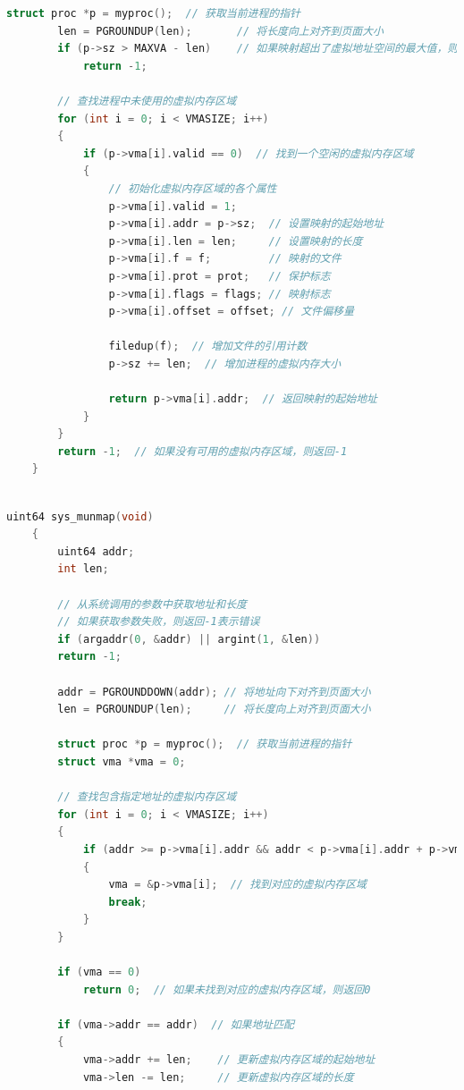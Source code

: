 \begin{enumerate}
\begin{lstlisting}[language=c,title=sys\_mmap的实现]
        struct proc *p = myproc();  // 获取当前进程的指针
        len = PGROUNDUP(len);       // 将长度向上对齐到页面大小
        if (p->sz > MAXVA - len)    // 如果映射超出了虚拟地址空间的最大值，则返回-1
            return -1;
    
        // 查找进程中未使用的虚拟内存区域
        for (int i = 0; i < VMASIZE; i++)
        {
            if (p->vma[i].valid == 0)  // 找到一个空闲的虚拟内存区域
            {
                // 初始化虚拟内存区域的各个属性
                p->vma[i].valid = 1;
                p->vma[i].addr = p->sz;  // 设置映射的起始地址
                p->vma[i].len = len;     // 设置映射的长度
                p->vma[i].f = f;         // 映射的文件
                p->vma[i].prot = prot;   // 保护标志
                p->vma[i].flags = flags; // 映射标志
                p->vma[i].offset = offset; // 文件偏移量
        
                filedup(f);  // 增加文件的引用计数
                p->sz += len;  // 增加进程的虚拟内存大小
        
                return p->vma[i].addr;  // 返回映射的起始地址
            }
        }
        return -1;  // 如果没有可用的虚拟内存区域，则返回-1
    }
                
    \end{lstlisting}
          \begin{lstlisting}[language=c,title=sys\_munmap的实现]
    uint64 sys_munmap(void)
    {
        uint64 addr;
        int len;
    
        // 从系统调用的参数中获取地址和长度
        // 如果获取参数失败，则返回-1表示错误
        if (argaddr(0, &addr) || argint(1, &len))
        return -1;
    
        addr = PGROUNDDOWN(addr); // 将地址向下对齐到页面大小
        len = PGROUNDUP(len);     // 将长度向上对齐到页面大小
    
        struct proc *p = myproc();  // 获取当前进程的指针
        struct vma *vma = 0;
    
        // 查找包含指定地址的虚拟内存区域
        for (int i = 0; i < VMASIZE; i++)
        {
            if (addr >= p->vma[i].addr && addr < p->vma[i].addr + p->vma[i].len)
            {
                vma = &p->vma[i];  // 找到对应的虚拟内存区域
                break;
            }
        }
    
        if (vma == 0)
            return 0;  // 如果未找到对应的虚拟内存区域，则返回0
    
        if (vma->addr == addr)  // 如果地址匹配
        {
            vma->addr += len;    // 更新虚拟内存区域的起始地址
            vma->len -= len;     // 更新虚拟内存区域的长度
        

\end{lstlisting}
\end{enumerate}
